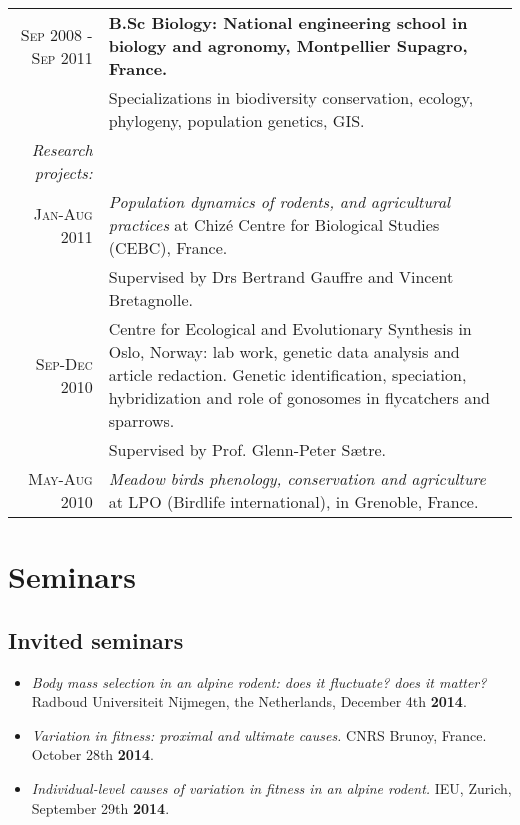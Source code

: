 \documentclass[a4paper,10pt]{article} %
\begin{document}
\begin{tabular}{r|p{11cm}}
\textsc{Sep 2008 - Sep 2011} & \textbf{B.Sc Biology: National engineering school in biology and agronomy, Montpellier Supagro, France.}\\
& \footnotesize{Specializations in biodiversity conservation, ecology, phylogeny, population genetics, GIS.}\\
\textit{Research projects:} & \\
\footnotesize{\textsc{Jan-Aug 2011}}& \emph{Population dynamics of rodents, and agricultural practices} at Chiz\'{e} Centre for Biological Studies (CEBC), France.\\ 
																		& \footnotesize{Supervised by Drs Bertrand Gauffre and Vincent Bretagnolle.} \par \\
\footnotesize{\textsc{Sep-Dec 2010}}&	Centre for Ecological and Evolutionary Synthesis in Oslo, Norway: lab work, genetic data analysis and article redaction. Genetic identification, speciation, hybridization and role of gonosomes in flycatchers and sparrows.\\
																		& \footnotesize{Supervised by Prof. Glenn-Peter S{\ae}tre.}\par \\
\footnotesize{\textsc{May-Aug 2010}}& \emph{Meadow birds phenology, conservation and agriculture} at LPO (Birdlife international), in Grenoble, France.
\end{tabular}



\section*{Seminars}
\subsection*{Invited seminars}
\begin{itemize}
\item \textit{Body mass selection in an alpine rodent: does it fluctuate? does it matter?} Radboud Universiteit Nijmegen, the Netherlands, December 4th \textbf{2014}.
\item \textit{Variation in fitness: proximal and ultimate causes.} CNRS Brunoy, France. October 28th \textbf{2014}.
\item \textit{Individual-level causes of variation in fitness in an alpine rodent.} IEU, Zurich, September 29th \textbf{2014}.
\end{itemize}
\end{document}
